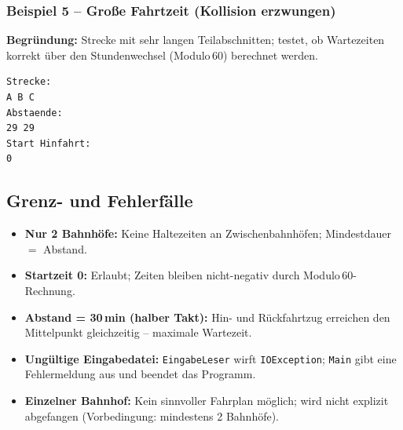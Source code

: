\documentclass[12pt,a4paper]{article}
\begin{document}
\subsubsection{Beispiel 5 -- Große Fahrtzeit (Kollision erzwungen)}

\textbf{Begründung:} Strecke mit sehr langen Teilabschnitten; testet, ob
Wartezeiten korrekt über den Stundenwechsel (Modulo\,60) berechnet werden.

\begin{lstlisting}
Strecke:
A B C
Abstaende:
29 29
Start Hinfahrt:
0
\end{lstlisting}

\subsection{Grenz- und Fehlerfälle}

\begin{itemize}
  \item \textbf{Nur 2 Bahnhöfe:} Keine Haltezeiten an Zwischenbahnhöfen;
        Mindestdauer $=$ Abstand.
  \item \textbf{Startzeit 0:} Erlaubt; Zeiten bleiben nicht-negativ durch
        Modulo\,60-Rechnung.
  \item \textbf{Abstand = 30\,min (halber Takt):} Hin- und Rückfahrtzug erreichen
        den Mittelpunkt gleichzeitig -- maximale Wartezeit.
  \item \textbf{Ungültige Eingabedatei:} \texttt{EingabeLeser} wirft
        \texttt{IOException}; \texttt{Main} gibt eine Fehlermeldung aus
        und beendet das Programm.
  \item \textbf{Einzelner Bahnhof:} Kein sinnvoller Fahrplan möglich; wird
        nicht explizit abgefangen (Vorbedingung: mindestens 2 Bahnhöfe).
\end{itemize}
\end{document}
